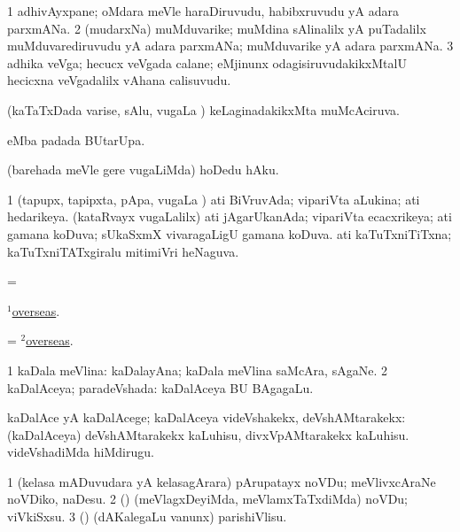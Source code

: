 \bentry
{}
\gl{\nA}
\bmng
\bnum
\num{1} adhivAyxpane; oMdara meVle haraDiruvudu, habibxruvudu yA adara parxmANa. 
\num{2} (mudarxNa) muMduvarike; muMdina sAlinalilx yA puTadalilx muMduvarediruvudu yA adara parxmANa; muMduvarike yA adara parxmANa. 
\num{3} adhika veVga; hecucx veVgada calane; eMjinunx odagisiruvudakikxMtalU hecicxna veVgadalilx vAhana calisuvudu. 
\enum
\emng
\eentry


\bentry
{}
\gl{\gu}
\bmng
(kaTaTxDada varise, sAlu, \mo vugaLa \vi) keLaginadakikxMta muMcAciruva. 
\emng
\eentry


\bentry
{}
\gl{\kirx}
\bmng
{} eMba padada BUtarUpa. 
\emng
\eentry


\bentry
{}
\gl{\sakirx}
\bmng
(barehada meVle gere \mo vugaLiMda) hoDedu hAku. 
\emng
\eentry


\bentry
{}
\gl{\gu}
\bmng
\bnum
\num{1} (tapupx, tapipxta, pApa, \mo vugaLa \vi) ati BiVruvAda; vipariVta aLukina; ati hedarikeya. 
 (kataRvayx \mo vugaLalilx) 
\banum
{} ati jAgarUkanAda; vipariVta ecacxrikeya; ati gamana koDuva; sUkaSxmX vivaragaLigU gamana koDuva. 
 ati kaTuTxniTiTxna; kaTuTxniTATxgiralu mitimiVri heNaguva. 
\eanum
\numie
\enum
\emng
\eentry

\bentry
{}
\gl{\gu}
\bmng
=
 \hyperlink{overseas(1)}{$^1$overseas}. 
\emng
\eentry

\bentry
{}
\gl{\kirxvi}
\bmng
= \hyperlink{overseas(2)}{$^2$overseas}. 
\emng
\eentry

\bentry
{}
\gl{\gu}
\bmng
\bnum
\num{1} kaDala meVlina:  kaDalayAna; kaDala meVlina saMcAra, sAgaNe. 
\num{2} kaDalAceya; paradeVshada:  kaDalAceya BU BAgagaLu. 
\enum
\emng
\eentry


\bentry
{}
\gl{\kirxvi}
\bmng
kaDalAce yA kaDalAcege; kaDalAceya videVshakekx, deVshAMtarakekx:  (kaDalAceya) deVshAMtarakekx kaLuhisu, divxVpAMtarakekx kaLuhisu.  videVshadiMda hiMdirugu. 
\emng
\eentry


\bentry
{}
\gl{\sakirx}
\bmng
\bnum
\num{1} (kelasa mADuvudara yA kelasagArara) pArupatayx noVDu; meVlivxcAraNe noVDiko, naDesu. 
\num{2} (\pArxparx) (meVlagxDeyiMda, meVlamxTaTxdiMda) noVDu; viVkiSxsu. 
\num{3} (\pArxparx) (dAKalegaLu \mo vanunx) parishiVlisu. 
\enum
\emng
\eentry


